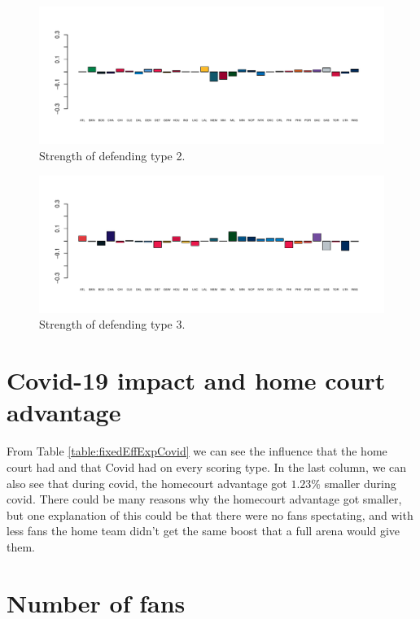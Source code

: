 \begin{figure}[H]
    \centering
    \includegraphics[width=1\textwidth]{Figures/Defence2.pdf}
    \caption[Attack2]{Strength of defending type 2.}
    \label{fig:Defence2}
\end{figure}

\begin{figure}[H]
    \centering
    \includegraphics[width=1\textwidth]{Figures/Defence3.pdf}
    \caption[Attack3]{Strength of defending type 3.}
    \label{fig:Defence3}
\end{figure}

\section{Covid-19 impact and home court advantage}

\noindent From Table \ref{table:fixedEffExpCovid} we can see the influence that the home court had and that Covid had on every scoring type. In the last column, we can also see that during covid, the homecourt advantage got $1.23\%$ smaller during covid. There could be many reasons why the homecourt advantage got smaller, but one explanation of this could be that there were no fans spectating, and with less fans the home team didn't get the same boost that a full arena would give them. \\

\section{Number of fans}

